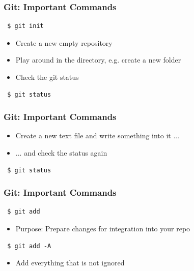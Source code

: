 \documentclass{beamer} %
\begin{document}
\begin{frame}[t, fragile]
\frametitle{Git: Important Commands}

\begin{verbatim} 
 $ git init
\end{verbatim}

\begin{itemize}
    \setlength\itemsep{1em}
	\item Create a new empty repository
    \item Play around in the directory, e.g. create a new folder
    \item Check the git status
\end{itemize}

\begin{verbatim} 
 $ git status
\end{verbatim}
\end{frame}

\begin{frame}[t, fragile]
\frametitle{Git: Important Commands}

\begin{itemize}
    \setlength\itemsep{1em}
    \item Create a new text file and write something into it ...
    \item ... and check the status again
\end{itemize}

\begin{verbatim} 
 $ git status
\end{verbatim}

\end{frame}


\begin{frame}[t, fragile]
\frametitle{Git: Important Commands}

\begin{verbatim} 
 $ git add
\end{verbatim}

\begin{itemize}
    \setlength\itemsep{1em}
	\item Purpose: Prepare changes for integration into your repo
\end{itemize}


\begin{verbatim} 
 $ git add -A
\end{verbatim}

\begin{itemize}
    \setlength\itemsep{1em}
	\item Add everything that is not ignored
\end{itemize}


\end{frame}
\end{document}
